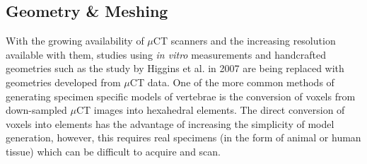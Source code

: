 \subsection{Geometry \& Meshing}\label{geometry-meshing}

With the growing availability of $\mu$CT scanners and the increasing
resolution available with them, studies using \emph{in vitro}
measurements and handcrafted geometries such as the study by Higgins et
al. \cite{Higgins2007a} in 2007 are being replaced with geometries developed
from
$\mu$CT data. One of the more common methods of generating specimen specific
models of vertebrae is the conversion of voxels from down-sampled $\mu$CT
images into hexahedral elements. The direct conversion of voxels into
elements has the advantage of increasing the simplicity of model
generation, however, this requires real specimens (in the form of animal or human tissue)
which can be difficult to acquire and scan.

